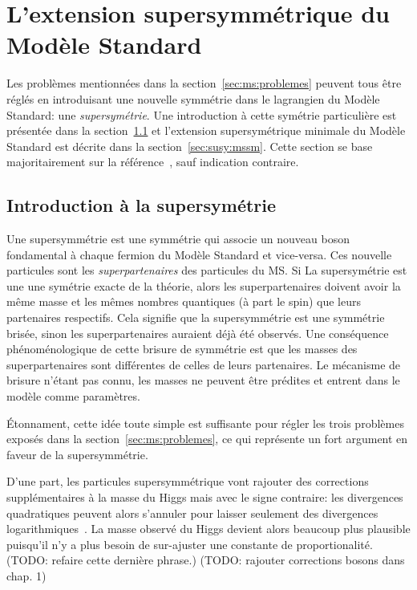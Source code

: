 \singlespacing{}
\chapter{L'extension supersymmétrique du Modèle Standard}
\label{sec:susy}
\doublespacing{}

Les problèmes mentionnées dans la section~\ref{sec:ms:problemes}
peuvent tous être réglés en introduisant une nouvelle symmétrie dans
le lagrangien du Modèle Standard: une \emph{supersymétrie}. Une
introduction à cette symétrie particulière est présentée dans la
section~\ref{sec:susy:th} et l'extension supersymétrique minimale du
Modèle Standard est décrite dans la section~\ref{sec:susy:mssm}. Cette
section se base majoritairement sur la
référence~\cite{olive_review_2014}, sauf indication contraire.

\section{Introduction à la supersymétrie}
\label{sec:susy:th}

Une supersymmétrie est une symmétrie qui associe un nouveau boson
fondamental à chaque fermion du Modèle Standard et vice-versa. Ces
nouvelle particules sont les \emph{superpartenaires} des particules du
MS. Si La supersymétrie est une une symétrie exacte de la théorie,
alors les superpartenaires doivent avoir la même masse et les mêmes
nombres quantiques (à part le spin) que leurs partenaires
respectifs. Cela signifie que la supersymmétrie est une symmétrie
brisée, sinon les superpartenaires auraient déjà été observés. Une
conséquence phénoménologique de cette brisure de symmétrie est que les
masses des superpartenaires sont différentes de celles de leurs
partenaires. Le mécanisme de brisure n'étant pas connu, les masses ne
peuvent être prédites et entrent dans le modèle comme paramètres.

Étonnament, cette idée toute simple est suffisante pour régler les
trois problèmes exposés dans la section~\ref{sec:ms:problemes}, ce qui
représente un fort argument en faveur de la supersymmétrie. 

D'une part, les particules supersymmétrique vont rajouter des
corrections supplémentaires à la masse du Higgs mais avec le signe
contraire: les divergences quadratiques peuvent alors s'annuler pour
laisser seulement des divergences
logarithmiques~\cite{martin_supersymmetry_1997}. La masse observé du
Higgs devient alors beaucoup plus plausible puisqu'il n'y a plus
besoin de sur-ajuster une constante de proportionalité. (TODO: refaire
cette dernière phrase.) (TODO: rajouter corrections bosons dans
chap. 1)

